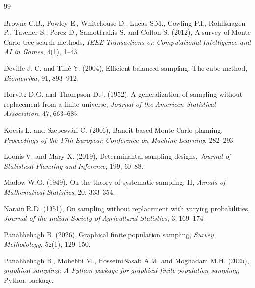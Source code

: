 \documentclass[twoside]{article}
\begin{document}
\begin{thebibliography}{99}

Browne C.B., Powley E., Whitehouse D., Lucas S.M., Cowling P.I., Rohlfshagen P., Tavener S., Perez D., Samothrakis S. and Colton S. (2012), A survey of Monte Carlo tree search methods, {\it IEEE Transactions on Computational Intelligence and AI in Games}, 4(1), 1--43.

Deville J.-C. and Till\'{e} Y. (2004), Efficient balanced sampling: The cube method, {\it Biometrika}, 91, 893--912.

Horvitz D.G. and Thompson D.J. (1952), A generalization of sampling without replacement from a finite universe, {\it Journal of the American Statistical Association}, 47, 663--685.

Kocsis L. and Szepesv\'{a}ri C. (2006), Bandit based Monte-Carlo planning, {\it Proceedings of the 17th European Conference on Machine Learning}, 282--293.

Loonis V. and Mary X. (2019), Determinantal sampling designs, {\it Journal of Statistical Planning and Inference}, 199, 60--88.

Madow W.G. (1949), On the theory of systematic sampling, II, {\it Annals of Mathematical Statistics}, 20, 333--354.

Narain R.D. (1951), On sampling without replacement with varying probabilities, {\it Journal of the Indian Society of Agricultural Statistics}, 3, 169--174.

Panahbehagh B. (2026), Graphical finite population sampling, {\it Survey Methodology}, 52(1), 129--150.

Panahbehagh B., Mohebbi M., HosseiniNasab A.M. and Moghadam M.H. (2025), {\it graphical-sampling: A Python package for graphical finite-population sampling}, Python package.

\end{thebibliography}
\end{document}
